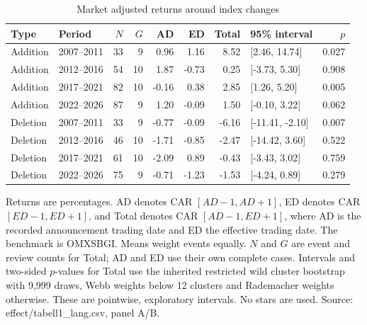 \begin{table}[!htbp]
\centering
\caption{Market adjusted returns around index changes}\label{tab:returns}
\small
\setlength{\tabcolsep}{5pt}
\begin{tabular}{llrrrrrlr}
\toprule
Type & Period & $N$ & $G$ & AD & ED & Total & 95\% interval & $p$ \\
\midrule
Addition & 2007--2011 & 33 & 9 & 0.96 & 1.16 & 8.52 & [2.46, 14.74] & 0.027 \\
Addition & 2012--2016 & 54 & 10 & 1.87 & -0.73 & 0.25 & [-3.73, 5.30] & 0.908 \\
Addition & 2017--2021 & 82 & 10 & -0.16 & 0.38 & 2.85 & [1.26, 5.20] & 0.005 \\
Addition & 2022--2026 & 87 & 9 & 1.20 & -0.09 & 1.50 & [-0.10, 3.22] & 0.062 \\
Deletion & 2007--2011 & 33 & 9 & -0.77 & -0.09 & -6.16 & [-11.41, -2.10] & 0.007 \\
Deletion & 2012--2016 & 46 & 10 & -1.71 & -0.85 & -2.47 & [-14.42, 3.60] & 0.522 \\
Deletion & 2017--2021 & 61 & 10 & -2.09 & 0.89 & -0.43 & [-3.43, 3.02] & 0.759 \\
Deletion & 2022--2026 & 75 & 9 & -0.71 & -1.23 & -1.53 & [-4.24, 0.89] & 0.279 \\
\bottomrule
\end{tabular}
\begin{minipage}{\linewidth}\footnotesize\vspace{5pt}
Returns are percentages. AD denotes CAR $[AD-1,AD+1]$, ED denotes CAR $[ED-1,ED+1]$, and Total denotes CAR $[AD-1,ED+1]$, where AD is the recorded announcement trading date and ED the effective trading date. The benchmark is OMXSBGI. Means weight events equally. $N$ and $G$ are event and review counts for Total; AD and ED use their own complete cases. Intervals and two-sided $p$-values for Total use the inherited restricted wild cluster bootstrap with 9,999 draws, Webb weights below 12 clusters and Rademacher weights otherwise. These are pointwise, exploratory intervals. No stars are used. Source: effect/tabell1\_lang.csv, panel A/B.
\end{minipage}
\end{table}
